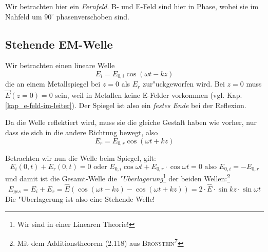\begin{Wichtig}
   Wir betrachten hier ein \emph{Fernfeld}. B- und E-Feld sind hier in
   Phase, wobei sie im Nahfeld um $90^\circ$ phasenverschoben sind.
\end{Wichtig}




\subsection{Stehende EM-Welle}
\label{kap_stehende-em-welle}

Wir betrachten einen lineare Welle
$$
E_i = E_{0,i} \cos (\omega t -
kz)
$$
 die an einem Metallspiegel bei $z = 0$ als $E_r$ zur"uckgeworfen
wird. Bei $z = 0$ muss $\vec E(z = 0) = 0$ sein, weil in Metallen
keine E-Felder vorkommen (vgl. Kap. \ref{kap_e-feld-im-leiter}). Der
Spiegel ist also ein \emph{festes Ende} bei der
Reflexion.

Da die Welle reflektiert wird, muss sie die gleiche Gestalt haben wie
vorher, nur dass sie sich in die andere Richtung bewegt, also
\begin{equation*}
E_r = E_{0,r} \cos (\omega t +
kz)
\end{equation*}

Betrachten wir nun die Welle beim Spiegel, gilt:
\begin{equation}
   \label{eq:414}
   E_i(0,t) + E_r(0,t) = 0 \text{ oder } E_{0,i} \cos \omega t +
   E_{0,r} \cdot \cos \omega t = 0 \text{ also } E_{0,i} = -E_{0,r}
\end{equation}
und damit ist die Gesamt-Welle die \emph{"Uberlagerung}\footnote{Wir
  sind in einer Linearen Theorie!} der beiden Wellen:\footnote{Mit dem
  Additionstheorem (2.118) aus \textsc{Bronstein}\textsuperscript{7}}
\begin{equation}
   \label{eq:415}
   E_{ges} = E_i + E_r = \hat E \left ( \cos( \omega t - k z) - \cos
      (\omega t + k z) \right )
=
2 \cdot \hat E \cdot \sin kz \cdot \sin \omega t
\end{equation}
Die "Uberlagerung ist also eine Stehende Welle!

